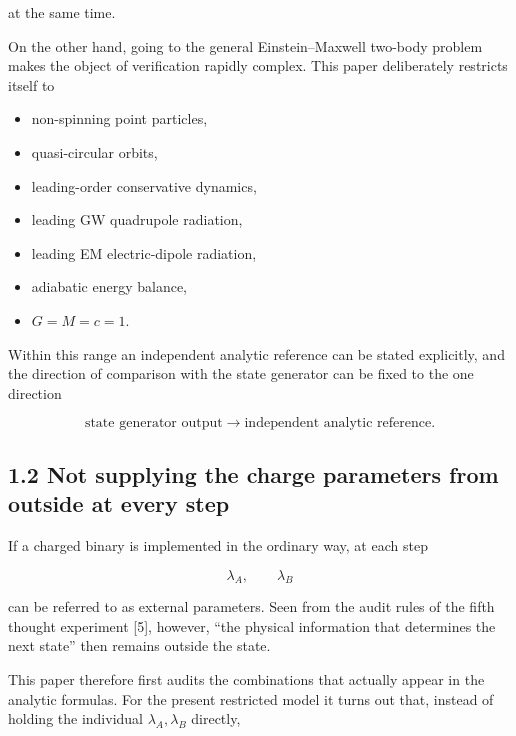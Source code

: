 \documentclass[
  a4paper,
]{article}
\providecommand{\tightlist}{%
  \setlength{\itemsep}{0pt}\setlength{\parskip}{0pt}}
\begin{document}
\begin{center}
\end{center}

at the same time.

On the other hand, going to the general Einstein--Maxwell two-body
problem makes the object of verification rapidly complex. This paper
deliberately restricts itself to

\begin{itemize}
\tightlist
\item
  non-spinning point particles,
\item
  quasi-circular orbits,
\item
  leading-order conservative dynamics,
\item
  leading GW quadrupole radiation,
\item
  leading EM electric-dipole radiation,
\item
  adiabatic energy balance,
\item
  \(G=M=c=1\).
\end{itemize}

Within this range an independent analytic reference can be stated
explicitly, and the direction of comparison with the state generator can
be fixed to the one direction

\[
\boxed{
\text{state generator output}
\longrightarrow
\text{independent analytic reference}.
}
\]

\subsection{1.2 Not supplying the charge parameters from outside at
every
step}\label{not-supplying-the-charge-parameters-from-outside-at-every-step}

If a charged binary is implemented in the ordinary way, at each step

\[
\lambda_A,
\qquad
\lambda_B
\]

can be referred to as external parameters. Seen from the audit rules of
the fifth thought experiment {[}5{]}, however, ``the physical
information that determines the next state'' then remains outside the
state.

This paper therefore first audits the combinations that actually appear
in the analytic formulas. For the present restricted model it turns out
that, instead of holding the individual \(\lambda_A,\lambda_B\)
directly,
\end{document}

